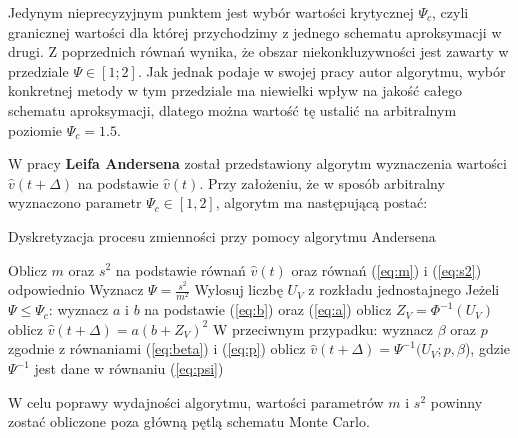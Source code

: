 \documentclass{pracamgr}
\begin{document}
Jedynym nieprecyzyjnym punktem jest wybór wartości krytycznej $\Psi_c$, czyli granicznej wartości dla 
której przychodzimy z jednego schematu aproksymacji w drugi. 
Z poprzednich równań wynika, że obszar niekonkluzywności jest zawarty w przedziale $\Psi \in [1;2]$.
Jak jednak podaje w swojej pracy autor algorytmu, wybór konkretnej metody w tym przedziale ma 
niewielki wpływ na jakość całego schematu aproksymacji, dlatego można wartość tę ustalić na 
arbitralnym poziomie $\Psi_c = 1.5$. 
 


W pracy \textbf{Leifa Andersena} \cite{Andersen} został 
przedstawiony algorytm wyznaczenia 
wartości $\hat{v}(t + \Delta)$ na podstawie $\hat{v}(t)$. Przy założeniu, 
że w sposób arbitralny wyznaczono parametr $\Psi_c \in [1,2]$, algorytm 
ma następującą postać:

\begin{algorithm}[H]
\caption{Dyskretyzacja procesu zmienności przy pomocy algorytmu Andersena}\label{andersenAlgorithmLabel}

\begin{algorithmic}[1]
 
  \State Oblicz $m$ oraz $s^2$ na podstawie równań $\hat{v}(t)$ oraz równań (\ref{eq:m}) i (\ref{eq:s2}) odpowiednio
  \State Wyznacz $\Psi = \frac{s^2}{m^2}$ 
  \State Wylosuj liczbę $U_V$ z rozkładu jednostajnego 
  \State Jeżeli $\Psi \leq \Psi_c$:
  \State \hspace{\algorithmicindent} wyznacz $a$ i $b$ na podstawie (\ref{eq:b}) oraz (\ref{eq:a})
  \State \hspace{\algorithmicindent} oblicz $Z_V = \Phi^{-1}(U_V)$
  \State \hspace{\algorithmicindent} oblicz $\hat{v}(t + \Delta)  = a(b+ Z_V)^2$
  \State W przeciwnym przypadku:
  \State \hspace{\algorithmicindent} wyznacz $\beta$ oraz $p$ zgodnie z równaniami (\ref{eq:beta}) i (\ref{eq:p})
  \State \hspace{\algorithmicindent} oblicz $\hat{v}(t + \Delta)  =\Psi^{-1}(U_V;p,\beta$), 
                                     gdzie $\Psi^{-1}$ jest dane w równaniu (\ref{eq:psi})
\end{algorithmic}
\label{alg:andersenAlgorithm}
\end{algorithm}



W celu poprawy wydajności algorytmu, wartości parametrów $m$ i $s^2$ powinny zostać obliczone poza 
główną pętlą schematu Monte Carlo.
\end{document}

